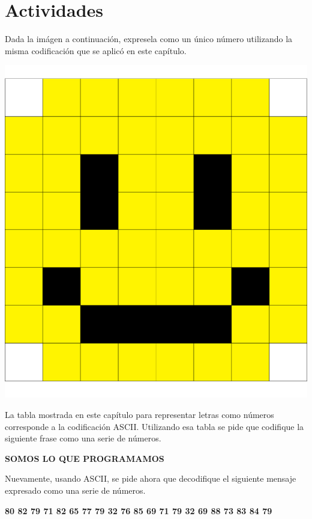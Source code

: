 \section{Actividades}

\begin{exercise}
Dada la imágen a continuación, expresela como un único
número utilizando la misma codificación que se aplicó
en este capítulo.

\centerline{\includegraphics[scale=0.5]{capitulos/bajo_nivel/imagenes/pixels_smile.png}}
\end{exercise}

\begin{exercise}
La tabla mostrada en este capítulo para representar letras como números
corresponde a la codificación ASCII. Utilizando esa tabla se pide que codifique
la siguiente frase como una serie de números.

\textbf{SOMOS LO QUE PROGRAMAMOS}
\end{exercise}

\begin{exercise}
Nuevamente, usando ASCII, se pide ahora que decodifique el siguiente mensaje
expresado como una serie de números.

\textbf{80 82 79 71 82 65 77 79 32 76 85 69 71 79 32 69 88 73 83 84 79}
\end{exercise}


